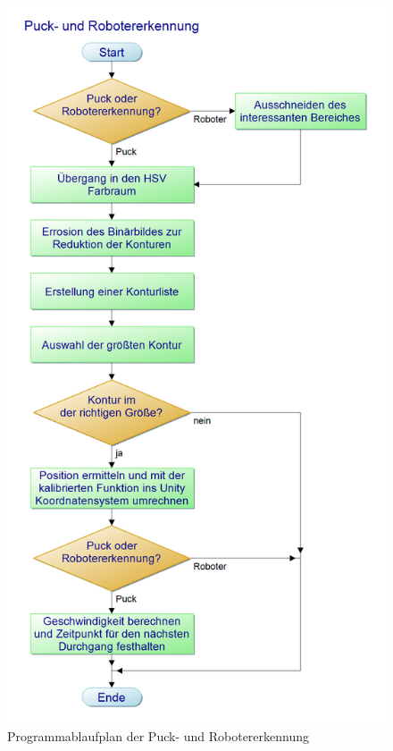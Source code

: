 \begin{figure} [h]
\begin{minipage}[t]{0.35\textwidth}
\end{minipage}
\hspace{0.1\textwidth}
\begin{minipage}[t]{0.45\textwidth}
\vspace{0pt}
\includegraphics[scale =0.3]{images/bv_pap}
 \caption{Programmablaufplan der Puck- und Robotererkennung}
 \label{bv_pap}
\end{minipage}
\end{figure}

